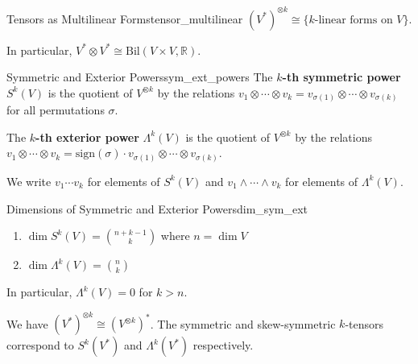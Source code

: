 \documentclass[11pt, letterpaper, openany]{book}
\begin{document}
\begin{cor}{Tensors as Multilinear Forms}{tensor_multilinear}
$(V^*)^{\otimes k} \cong \{\text{$k$-linear forms on } V\}$.

In particular, $V^* \otimes V^* \cong \text{Bil}(V \times V, \mathbb{R})$.
\end{cor}

\begin{defn}{Symmetric and Exterior Powers}{sym_ext_powers}
The \textbf{$k$-th symmetric power} $S^k(V)$ is the quotient of $V^{\otimes k}$ by the relations $v_1 \otimes \cdots \otimes v_k = v_{\sigma(1)} \otimes \cdots \otimes v_{\sigma(k)}$ for all permutations $\sigma$.

The \textbf{$k$-th exterior power} $\Lambda^k(V)$ is the quotient of $V^{\otimes k}$ by the relations $v_1 \otimes \cdots \otimes v_k = \text{sign}(\sigma) \cdot v_{\sigma(1)} \otimes \cdots \otimes v_{\sigma(k)}$.

We write $v_1 \cdots v_k$ for elements of $S^k(V)$ and $v_1 \wedge \cdots \wedge v_k$ for elements of $\Lambda^k(V)$.
\end{defn}

\begin{thm}{Dimensions of Symmetric and Exterior Powers}{dim_sym_ext}
\begin{enumerate}
    \item $\dim S^k(V) = \binom{n + k - 1}{k}$ where $n = \dim V$
    \item $\dim \Lambda^k(V) = \binom{n}{k}$
\end{enumerate}
In particular, $\Lambda^k(V) = 0$ for $k > n$.
\end{thm}

\begin{remark}
We have $(V^*)^{\otimes k} \cong (V^{\otimes k})^*$. The symmetric and skew-symmetric $k$-tensors correspond to $S^k(V^*)$ and $\Lambda^k(V^*)$ respectively.
\end{remark}
\end{document}
